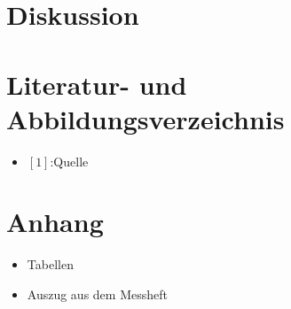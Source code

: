 \documentclass[11pt,ngerman,a4paper]{article}
\begin{document}
\section{Diskussion}

\section{Literatur- und Abbildungsverzeichnis}
\begin{itemize}
\item $[1]$:Quelle
\end{itemize}
\section{Anhang}
\begin{itemize}
\item Tabellen
\item Auszug aus dem Messheft


\end{itemize}

\newpage
\end{document}
